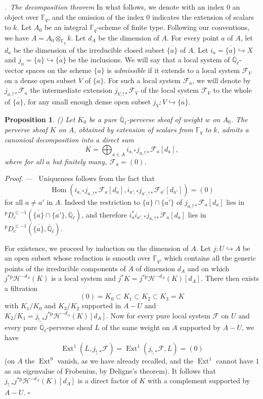 \documentclass[12pt,a4paper,oneside,english,leqno]{smfart}
\makeatletter
\numberwithin{equation}{subsection}
\newcounter{theo}
\numberwithin{theo}{subsection}
\newenvironment{paragr}[1][]{\medskip\refstepcounter{subsection}%
  \par\noindent\hspace*{\parindent}\thesubsection.\ \emph{#1}%
  \@ifundefined{@empty}{}{}\ignorespaces}{\medskip}
\theoremstyle{plain}
\newtheorem{proposition}[theo]{Proposition}
\theoremstyle{definition}
\theoremstyle{remark}
\newenvironment{preuve}[1][]{\medskip\noindent\textit{Proof.} #1 ---\ }%
  {\hfill\ensuremath{\square}\medskip}
\DeclareMathOperator{\Hom}{Hom}
\DeclareMathOperator{\Ext}{Ext}
\newcommand{\Fq}{\mathbb{F}_q}
\newcommand{\Qlb}{\overline{\mathbb{Q}}_{\ell}}
\newcommand{\fc}{\mathcal{F}}
\newcommand{\hc}{\mathcal{H}}
\renewcommand{\leq}{\leqslant}
\makeatother
\begin{document}
\begin{paragr}[The decomposition theorem]\label{S:10.1}
In what follows, we denote with an index $0$ an object over $\Fq$, and the omission of the index $0$ indicates the extension of scalars to $k$. Let $A_0$ be an integral $\Fq$-scheme of finite type. Following our conventions, we have $A = A_0\otimes_{\Fq}k$. Let $d_A$ be the dimension of $A$. For every point $a$ of $A$, let $d_a$ be the dimension of the irreducible closed subset $\overline{\{a\}}$ of $A$. Let $i_a = \overline{\{a\}}\hookrightarrow X$ and $j_a = \{a\}\hookrightarrow\overline{\{a\}}$ be the inclusions. We will say that a local system of $\Qlb$-vector spaces on the scheme $\{a\}$ is \emph{admissible} if it extends to a local system $\fc_V$ on a dense open subset $V$ of $\overline{\{a\}}$. For such a local system $\fc_a$, we will denote by $j_{a,!*}\fc_a$ the intermediate extension $j_{V,!*}\fc_V$ of the local system $\fc_V$ to the whole of $\overline{\{a\}}$, for any small enough dense open subset $j_V : V\hookrightarrow\overline{\{a\}}$.

\begin{proposition}\label{thm:10.1.1}
(\cite[Theorem~5.3.8]{BBD}) Let $K_0$ be a pure $\Qlb$-perverse sheaf of weight $w$ on $A_0$. The perverse sheaf $K$ on $A$, obtained by extension of scalars from $\Fq$ to $k$, admits a canonical decomposition into a direct sum
$$K = \bigoplus_{a\in A} i_{a,*}j_{a,!*}\fc_a[d_a],$$
where for all $a$ but finitely many, $\fc_a = (0)$.
\end{proposition}

\begin{preuve}
Uniqueness follows from the fact that
$$\Hom(i_{a,*}j_{a,!*}\fc_a[d_a], i_{a',*}j_{a',!*}\fc_{a'}[d_{a'}]) = (0)$$
for all $a\neq a'$ in $A$. Indeed the restriction to $\overline{\{a\}}\cap\overline{\{a'\}}$ of $j_{a,!*}\fc_a[d_a]$ lies in ${}^{\mathrm{p}}D_c^{\leq-1}(\overline{\{a\}}\cap\overline{\{a'\}},\Qlb)$, and therefore $i_a^*i_{a',*}j_{a,!*}\fc_a[d_a]$ lies in ${}^{\mathrm{p}}D_c^{\leq-1}(\overline{\{a\}},\Qlb)$.

For existence, we proceed by induction on the dimension of $A$. Let $j : U\hookrightarrow A$ be an open subset whose reduction is smooth over $\Fq$, which contains all the generic points of the irreducible components of $A$ of dimension $d_A$ and on which $j^{*\mathrm{p}}\hc^{-d_A}(K)$ is a local system and $j^*K = j^{*\mathrm{p}}\hc^{-d_A}(K)[d_A]$. There then exists a filtration
$$(0) = K_0\subset K_1\subset K_2\subset K_3 = K$$
with $K_1/K_0$ and $K_3/K_2$ supported in $A-U$ and $K_2/K_1 = j_{!,*}j^{*\mathrm{p}}\hc^{-d_A}(K)[d_A]$. Now for every pure local system $\fc$ on $U$ and every pure $\Qlb$-perverse sheaf $L$ of the same weight on $A$ supported by $A-U$, we have
$$\Ext^1(L, j_{!,*}\fc) = \Ext^1(j_{!,*}\fc, L) = (0)$$
(on $A$ the $\Ext^0$ vanish, as we have already recalled, and the $\Ext^1$ cannot have $1$ as an eigenvalue of Frobenius, by Deligne's theorem). It follows that $j_{!,*}j^{*\mathrm{p}}\hc^{-d_A}(K)[d_A]$ is a direct factor of $K$ with a complement supported by $A-U$.
\end{preuve}
\end{paragr}
\end{document}
